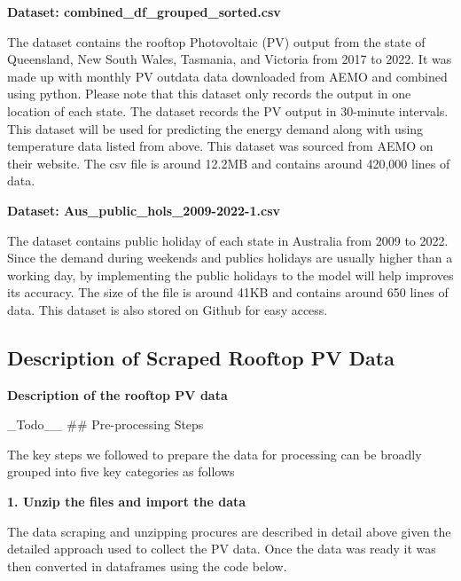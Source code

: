 \documentclass[
]{article}
\begin{document}
\textbf{Dataset: combined\_df\_grouped\_sorted.csv}

The dataset contains the rooftop Photovoltaic (PV) output from the state
of Queensland, New South Wales, Tasmania, and Victoria from 2017 to
2022. It was made up with monthly PV outdata data downloaded from AEMO
and combined using python. Please note that this dataset only records
the output in one location of each state. The dataset records the PV
output in 30-minute intervals. This dataset will be used for predicting
the energy demand along with using temperature data listed from above.
This dataset was sourced from AEMO on their website. The csv file is
around 12.2MB and contains around 420,000 lines of data.

\textbf{Dataset: Aus\_public\_hols\_2009-2022-1.csv}

The dataset contains public holiday of each state in Australia from 2009
to 2022. Since the demand during weekends and publics holidays are
usually higher than a working day, by implementing the public holidays
to the model will help improves its accuracy. The size of the file is
around 41KB and contains around 650 lines of data. This dataset is also
stored on Github for easy access.

\subsection{Description of Scraped Rooftop PV
Data}\label{description-of-scraped-rooftop-pv-data}

\textbf{Description of the rooftop PV data}

\_Todo\_\_ \#\# Pre-processing Steps

The key steps we followed to prepare the data for processing can be
broadly grouped into five key categories as follows

\textbf{1. Unzip the files and import the data}

The data scraping and unzipping procures are described in detail above
given the detailed approach used to collect the PV data. Once the data
was ready it was then converted in dataframes using the code below.
\end{document}

